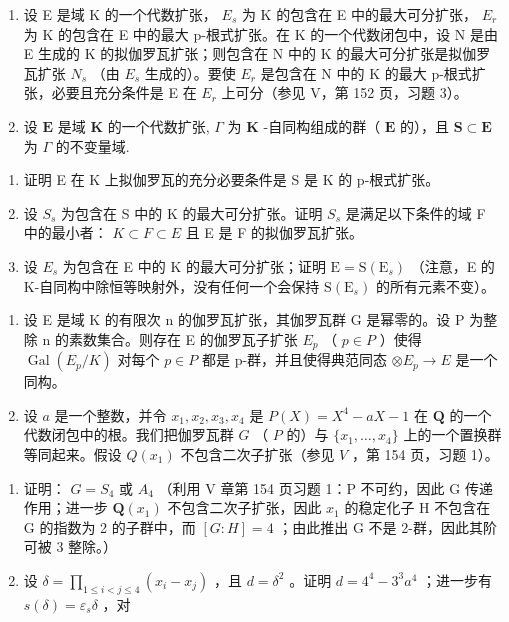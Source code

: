 \begin{enumerate}
\def\labelenumi{\arabic{enumi})}
\setcounter{enumi}{12}
\item
  设 E 是域 K 的一个代数扩张， \(E_{s}\) 为 K 的包含在 E 中的最大可分扩张， \(E_{r}\) 为 K 的包含在 E 中的最大 p-根式扩张。在 K 的一个代数闭包中，设 N 是由 E 生成的 K 的拟伽罗瓦扩张；则包含在 N 中的 K 的最大可分扩张是拟伽罗瓦扩张 \(N_{s}\) （由 \(E_{s}\) 生成的）。要使 \(E_{r}\) 是包含在 N 中的 K 的最大 p-根式扩张，必要且充分条件是 E 在 \(E_{r}\) 上可分（参见 V，第 152 页，习题 3）。
\item
  设 \(\mathbf{E}\) 是域 \(\mathbf{K}\) 的一个代数扩张, \(\Gamma\) 为 \(\mathbf{K}\) -自同构组成的群（ \(\mathbf{E}\) 的），且 \(\mathbf{S} \subset \mathbf{E}\) 为 \(\Gamma\) 的不变量域.
\end{enumerate}

\begin{enumerate}
\def\labelenumi{\alph{enumi})}
\item
  证明 E 在 K 上拟伽罗瓦的充分必要条件是 S 是 K 的 p-根式扩张。
\item
  设 \(S_{s}\) 为包含在 S 中的 K 的最大可分扩张。证明 \(S_{s}\) 是满足以下条件的域 F 中的最小者： \(K \subset F \subset E\) 且 E 是 F 的拟伽罗瓦扩张。
\item
  设 \(E_{s}\) 为包含在 E 中的 K 的最大可分扩张；证明 \(\mathrm{E} = \mathrm{S}(\mathrm{E}_{s})\) （注意，E 的 K-自同构中除恒等映射外，没有任何一个会保持 \(\mathrm{S}(\mathrm{E}_{s})\) 的所有元素不变）。
\end{enumerate}

\begin{enumerate}
\def\labelenumi{\arabic{enumi})}
\setcounter{enumi}{14}
\item
  设 E 是域 K 的有限次 n 的伽罗瓦扩张，其伽罗瓦群 G 是幂零的。设 P 为整除 n 的素数集合。则存在 E 的伽罗瓦子扩张 \(E_{p}\) （ \(p \in P\) ）使得 \(\operatorname{Gal}(E_{p}/K)\) 对每个 \(p \in P\) 都是 p-群，并且使得典范同态 \(\otimes E_{p} \to E\) 是一个同构。
\item
  设 \(a\) 是一个整数，并令 \(x_1, x_2, x_3, x_4\) 是 \(P(X) = X^4 - aX - 1\) 在 \(\mathbf{Q}\) 的一个代数闭包中的根。我们把伽罗瓦群 \(G\) （ \(P\) 的）与 \(\{x_1, \ldots, x_4\}\) 上的一个置换群等同起来。假设 \(Q(x_1)\) 不包含二次子扩张（参见 \(V\) ，第 154 页，习题 1）。
\end{enumerate}

\begin{enumerate}
\def\labelenumi{\alph{enumi})}
\item
  证明： \(G = S_{4}\) 或 \(A_{4}\) （利用 V 章第 154 页习题 1：P 不可约，因此 G 传递作用；进一步 \(\mathbf{Q}(x_{1})\) 不包含二次子扩张，因此 \(x_{1}\) 的稳定化子 H 不包含在 G 的指数为 2 的子群中，而 \([G:H] = 4\) ；由此推出 G 不是 2-群，因此其阶可被 3 整除。）
\item
  设 \(\delta = \prod_{1\leqslant i < j\leqslant 4}(x_i - x_j)\) ，且 \(d = \delta^2\) 。证明 \(d = 4^4 -3^3 a^4\) ；进一步有 \(s(\delta) = \varepsilon_s\delta\) ，对
\end{enumerate}

